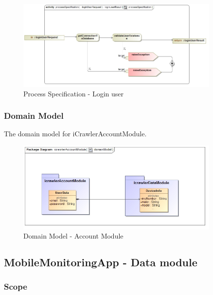 \documentclass[hidelinks, 12pt, oneside]{article}
\begin{document}
		
		\begin{figure}[!htbp]
    		\centering
    		\includegraphics[width=0.9\textwidth]{img/processSpecificationLoginUser.jpg}
    		\caption{Process Specification - Login user}
    		\label{fig:ProcessSpec_loginUser}
		\end{figure}
		\newpage
		
		\subsubsection{Domain Model}
		The domain model for iCrawlerAccountModule.
		
		
		\begin{figure}[!htbp]
    		\centering
    		\includegraphics[width=0.9\textwidth]{img/DomainModelAccountModule.jpg}
    		\caption{Domain Model - Account Module}
    		\label{fig:DomainMod_accountModule}
		\end{figure}
		\newpage
		
	\subsection{MobileMonitoringApp - Data module}
	\subsubsection{Scope}
	
\end{document}
